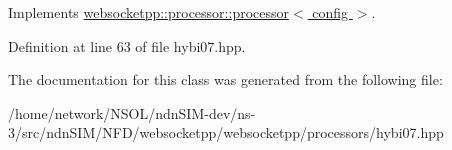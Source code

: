 Implements \hyperlink{classwebsocketpp_1_1processor_1_1processor_ab5bc7b8f480ee28049f44232115bcaab}{websocketpp\+::processor\+::processor$<$ config $>$}.



Definition at line 63 of file hybi07.\+hpp.



The documentation for this class was generated from the following file\+:\begin{DoxyCompactItemize}
\item 
/home/network/\+N\+S\+O\+L/ndn\+S\+I\+M-\/dev/ns-\/3/src/ndn\+S\+I\+M/\+N\+F\+D/websocketpp/websocketpp/processors/hybi07.\+hpp\end{DoxyCompactItemize}
